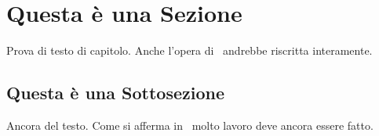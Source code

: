 \section{Questa \`e una Sezione}

Prova di testo di capitolo. Anche l'opera di~\cite{LAR:2005} andrebbe riscritta interamente.

\subsection{Questa \`e una Sottosezione}

Ancora del testo. Come si afferma in~\cite{jones96analysis} molto lavoro deve ancora essere fatto.
